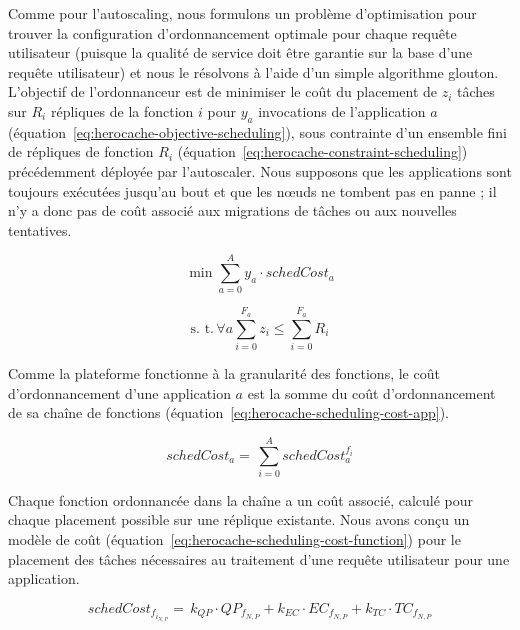 {Comme pour l'autoscaling, nous formulons un problème d'optimisation pour trouver la configuration d'ordonnancement optimale pour chaque requête utilisateur (puisque la qualité de service doit être garantie sur la base d'une requête utilisateur) et nous le résolvons à l'aide d'un simple algorithme glouton. L'objectif de l'ordonnanceur est de minimiser le coût du placement de $z_i$ tâches sur $R_i$ répliques de la fonction $i$ pour $y_a$ invocations de l'application $a$ (équation~\ref{eq:herocache-objective-scheduling}), sous contrainte d'un ensemble fini de répliques de fonction $R_{i}$ (équation~\ref{eq:herocache-constraint-scheduling}) précédemment déployée par l'autoscaler. Nous supposons que les applications sont toujours exécutées jusqu'au bout et que les nœuds ne tombent pas en panne ; il n'y a donc pas de coût associé aux migrations de tâches ou aux nouvelles tentatives.

\begin{equation}
    \min \sum_{a = 0}^{A} y_a \cdot schedCost_{a}
\label{eq:herocache-objective-scheduling}
\end{equation}

\begin{equation}
    \text{s. t.} \, \forall a \sum_{i = 0}^{F_a} z_i \leq \sum_{i = 0}^{F_a} R_{i}
\label{eq:herocache-constraint-scheduling}
\end{equation}

Comme la plateforme fonctionne à la granularité des fonctions, le coût d'ordonnancement d'une application $a$ est la somme du coût d'ordonnancement de sa chaîne de fonctions (équation~\ref{eq:herocache-scheduling-cost-app}).

\begin{equation}
    schedCost_{a} = \, \sum_{i = 0}^{A} schedCost^{{{f}_{i}}}_{a}
\label{eq:herocache-scheduling-cost-app}
\end{equation}

Chaque fonction ordonnancée dans la chaîne a un coût associé, calculé pour chaque placement possible sur une réplique existante. Nous avons conçu un modèle de coût (équation~\ref{eq:herocache-scheduling-cost-function}) pour le placement des tâches nécessaires au traitement d'une requête utilisateur pour une application.

\begin{equation}
    schedCost_{{f}_{{i}_{N, P}}} = \, k_{QP} \cdot QP_{{f}_{N, P}} + k_{EC} \cdot {EC}_{{f}_{N, P}} + k_{TC} \cdot TC_{{f}_{N, P}}
\label{eq:herocache-scheduling-cost-function}
\end{equation}

}
